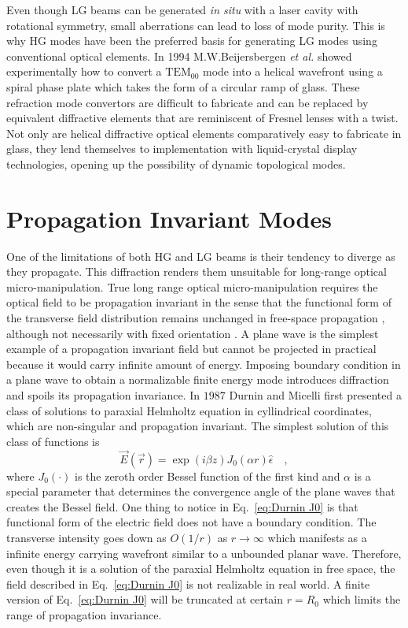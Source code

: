 Even though LG beams can be generated \emph{in situ} with a laser cavity with rotational symmetry, small aberrations can lead to loss of mode purity. This is why HG modes have been the preferred basis for generating LG modes using conventional optical elements. In 1994 M.W.Beijersbergen \emph{et al.} \cite{BEIJERSBERGEN1994321} showed experimentally how to convert a $\mathrm{TEM}_{00}$ mode into a helical wavefront using a spiral phase plate \cite{Ruffato:14} which takes the form of a circular ramp of glass. These refraction mode convertors are difficult to fabricate and can be replaced by equivalent diffractive elements that are reminiscent of Fresnel lenses with a twist. Not only are helical diffractive optical elements comparatively easy to fabricate in glass, they lend themselves to implementation with liquid-crystal display technologies, opening up the possibility of dynamic topological modes.


\section{Propagation Invariant Modes}

One of the limitations of both HG and LG beams is their tendency to diverge as they propagate. This diffraction renders them unsuitable for long-range optical micro-manipulation. True long range optical micro-manipulation requires the optical field to be propagation invariant \cite{TURUNEN20101} in the sense that the functional form of the transverse field distribution remains unchanged in free-space propagation \cite{bouchal1996}, although not necessarily with fixed orientation \cite{Piestun:98}. A plane wave is the simplest example of a propagation invariant field but cannot be projected in practical because it would carry infinite amount of energy. Imposing boundary condition in a plane wave to obtain a normalizable finite energy mode introduces diffraction and spoils its propagation invariance. In $1987$ Durnin and Micelli \cite{Durnin:87} first presented a class of solutions to paraxial Helmholtz  equation in cyllindrical coordinates, which are non-singular and propagation invariant. The simplest solution of this class of functions is
\begin{equation}
\label{eq:Durnin J0}
\vec{E}(\vec{r}) = \exp (i\beta z)J_{0}(\alpha r) \hat{\epsilon} \quad ,
\end{equation}
where $J_0 (\cdot)$ is the zeroth order Bessel function of the first kind and $\alpha$ is a special parameter that determines the convergence angle of the plane waves that creates the Bessel field. One thing to notice in Eq.~\eqref{eq:Durnin J0} is that functional form of the electric field does not have a boundary condition. The transverse intensity goes down as $O(1/r)$ as $r\rightarrow \infty$ which manifests as a infinite energy carrying wavefront similar to a unbounded planar wave. Therefore, even though it is a solution of the paraxial Helmholtz equation in free space, the field described in Eq.~\eqref{eq:Durnin J0} is not realizable in real world. A finite version of Eq.~\eqref{eq:Durnin J0} will be truncated at certain $r = R_0$ which limits the range of propagation invariance.

